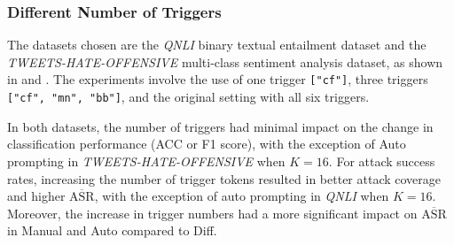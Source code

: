 \subsubsection{Different Number of Triggers}
The datasets chosen are the \textit{QNLI} binary textual entailment dataset and the \textit{TWEETS-HATE-OFFENSIVE} multi-class sentiment analysis dataset, as shown in  and . The experiments involve the use of one trigger \texttt{["cf"]}, three triggers \texttt{["cf", "mn", "bb"]}, and the original setting with all six triggers.

In both datasets, the number of triggers had minimal impact on the change in classification performance (ACC or F1 score), with the exception of Auto prompting in \textit{TWEETS-HATE-OFFENSIVE} when $K = 16$. For attack success rates, increasing the number of trigger tokens resulted in better attack coverage and higher $\overline{\text{ASR}}$, with the exception of auto prompting in \textit{QNLI} when $K = 16$. Moreover, the increase in trigger numbers had a more significant impact on $\overline{\text{ASR}}$ in Manual and Auto compared to Diff.
